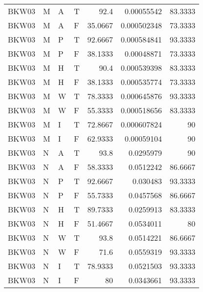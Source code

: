\begin{tabular}{llllrrr}
    BKW03    & M     & A     & T          & 92.4       & 0.00055542  & 83.3333  \\
    BKW03    & M     & A     & F          & 35.0667    & 0.000502348 & 73.3333  \\
    BKW03    & M     & P     & T          & 92.6667    & 0.000584841 & 93.3333  \\
    BKW03    & M     & P     & F          & 38.1333    & 0.00048871  & 73.3333  \\
    BKW03    & M     & H     & T          & 90.4       & 0.000539398 & 83.3333  \\
    BKW03    & M     & H     & F          & 38.1333    & 0.000535774 & 73.3333  \\
    BKW03    & M     & W     & T          & 78.3333    & 0.000645876 & 93.3333  \\
    BKW03    & M     & W     & F          & 55.3333    & 0.000518656 & 83.3333  \\
    BKW03    & M     & I     & T          & 72.8667    & 0.000607824 & 90       \\
    BKW03    & M     & I     & F          & 62.9333    & 0.00059104  & 90       \\
    BKW03    & N     & A     & T          & 93.8       & 0.0295979   & 90       \\
    BKW03    & N     & A     & F          & 58.3333    & 0.0512242   & 86.6667  \\
    BKW03    & N     & P     & T          & 92.6667    & 0.030483    & 93.3333  \\
    BKW03    & N     & P     & F          & 55.7333    & 0.0457568   & 86.6667  \\
    BKW03    & N     & H     & T          & 89.7333    & 0.0259913   & 83.3333  \\
    BKW03    & N     & H     & F          & 51.4667    & 0.0534011   & 80       \\
    BKW03    & N     & W     & T          & 93.8       & 0.0514221   & 86.6667  \\
    BKW03    & N     & W     & F          & 71.6       & 0.0559319   & 93.3333  \\
    BKW03    & N     & I     & T          & 78.9333    & 0.0521503   & 93.3333  \\
    BKW03    & N     & I     & F          & 80         & 0.0343661   & 93.3333  \\
    \hline
\end{tabular}